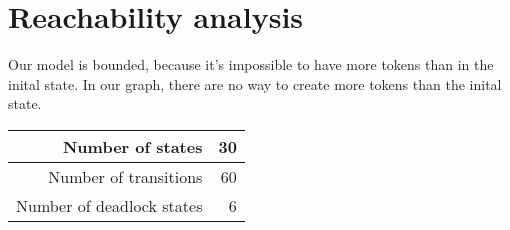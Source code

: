 \section{Reachability analysis}
\label{sec:Reachability analysis}
Our model is bounded, because it's impossible to have more tokens than in the inital state. In our graph, there are no way to create more tokens than the inital state.


\begin{table}[h]
   \begin{tabular}{|r|r|}
       \hline
       Number of states & 30 \\
       \hline
       Number of transitions & 60 \\
       \hline
       Number of deadlock states & 6 \\
       \hline
   \end{tabular}
\end{table}
